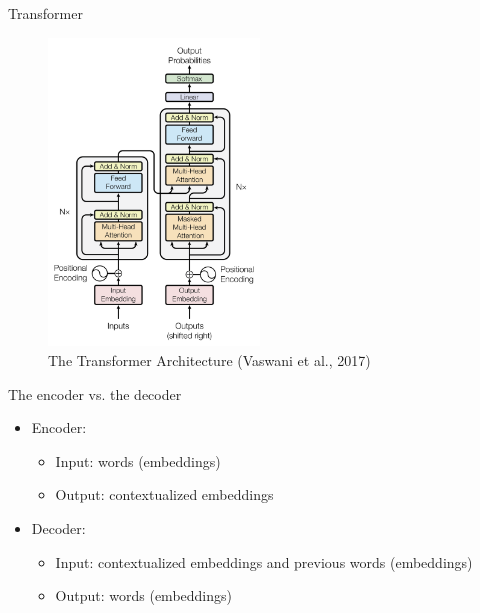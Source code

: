 \documentclass[10pt]{beamer}
\begin{document}
\begin{frame}{Transformer}

\begin{figure}[h]
\centering
\includegraphics[width=0.5\textwidth]{fig/Vaswani_1_transformer.png}
\caption{The Transformer Architecture (Vaswani et al., 2017)}
\end{figure}



\end{frame}

\begin{frame}{The encoder vs. the decoder}

\begin{itemize}
\item Encoder:
\begin{itemize}
\item Input: words (embeddings)
\item Output: contextualized embeddings
\end{itemize}
\item Decoder:
\begin{itemize}
\item Input: contextualized embeddings {\color{uured} and previous words} (embeddings)
\item Output: words (embeddings)
\end{itemize}
\end{itemize}
\end{frame}
\end{document}

